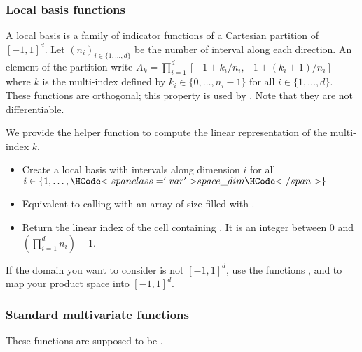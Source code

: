 \subsubsection{Local basis functions}

A local basis is a family of indicator functions of a Cartesian partition of ${[-1,1]}^d$. Let $(n_i)_{i \in \{1, \dots, d\}}$ be the number of interval along each direction. An element of the partition write $A_k = \prod_{i=1}^d [-1 + k_i/n_i, -1 + (k_i + 1) / n_i]$ where $k$ is the multi-index defined by $k_i \in \{0, \dots, n_i - 1\}$ for all $i\in \{1,\dots, d\}$. These functions are orthogonal; this property is used by . Note that they are not differentiable.

We provide the helper function  to compute the linear representation of the multi-index $k$.

\begin{itemize}
  \item {}
  \sshortdescribe Create a local basis with  intervals along dimension $i$ for all $i \in \{1, \dots, \var{space\_dim}\}$
  \item {}
  \sshortdescribe Equivalent to calling  with an array of size  filled with .
  \item {}
  \sshortdescribe Return the linear index of the cell containing . It is an integer between $0$ and $(\prod_{i=1}^d n_i) - 1$.
\end{itemize}

If the domain you want to consider is not ${[-1,1]}^d$, use the functions ,  and  to map your product space into ${[-1,1]}^d$.

\subsubsection{Standard multivariate functions}

These functions are supposed to be .

